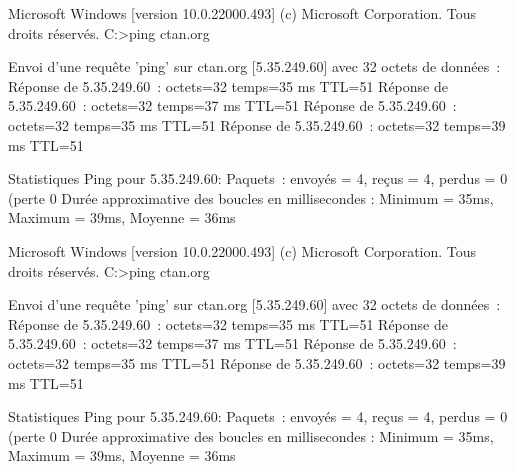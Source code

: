 \documentclass{article}
\begin{document}
\begin{codetex}
\begin{PLtermwin}[15cm]{} %
Microsoft Windows [version 10.0.22000.493]
(c) Microsoft Corporation. Tous droits réservés.
C:\Users\test>ping ctan.org

Envoi d’une requête 'ping' sur ctan.org [5.35.249.60] avec 32 octets de données :
Réponse de 5.35.249.60 : octets=32 temps=35 ms TTL=51
Réponse de 5.35.249.60 : octets=32 temps=37 ms TTL=51
Réponse de 5.35.249.60 : octets=32 temps=35 ms TTL=51
Réponse de 5.35.249.60 : octets=32 temps=39 ms TTL=51

Statistiques Ping pour 5.35.249.60:
Paquets : envoyés = 4, reçus = 4, perdus = 0 (perte 0%
Durée approximative des boucles en millisecondes :
Minimum = 35ms, Maximum = 39ms, Moyenne = 36ms
\end{PLtermwin}

\end{codetex}

\begin{codesortie}
\begin{PLtermwin}[15cm]{}
Microsoft Windows [version 10.0.22000.493]
(c) Microsoft Corporation. Tous droits réservés.
C:\Users\test>ping ctan.org

Envoi d’une requête 'ping' sur ctan.org [5.35.249.60] avec 32 octets de données :
Réponse de 5.35.249.60 : octets=32 temps=35 ms TTL=51
Réponse de 5.35.249.60 : octets=32 temps=37 ms TTL=51
Réponse de 5.35.249.60 : octets=32 temps=35 ms TTL=51
Réponse de 5.35.249.60 : octets=32 temps=39 ms TTL=51

Statistiques Ping pour 5.35.249.60:
Paquets : envoyés = 4, reçus = 4, perdus = 0 (perte 0%
Durée approximative des boucles en millisecondes :
Minimum = 35ms, Maximum = 39ms, Moyenne = 36ms
\end{PLtermwin}


\end{codesortie}
\end{document}
